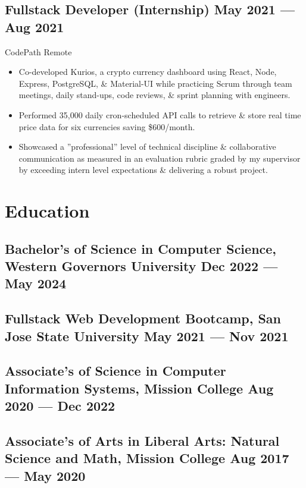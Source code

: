 \documentclass[a4,10pt]{article}
\newcommand{\subtext}[1]{
#1\par\vspace{-0.2cm}}
\newenvironment{zitemize}{
\begin{itemize}\itemsep0pt \parskip0pt \parsep1pt}
{\end{itemize}\vspace{-0.5cm}}
\begin{document}

\subsection*{Fullstack Developer {\normalsize \normalfont(Internship) } \hfill  May 2021 --- Aug 2021 }
\subtext{CodePath \hfill Remote } 
    \begin{zitemize}
        \item Co-developed Kurios, a crypto currency dashboard using React, Node, Express, PostgreSQL, \& Material-UI while practicing Scrum through team meetings, daily stand-ups, code reviews, \& sprint planning with engineers.
        \item Performed 35,000 daily cron-scheduled API calls to retrieve \& store real time price data for six currencies saving \$600/month.
        \item Showcased a ”professional” level of technical discipline \& collaborative communication as measured in an evaluation rubric graded by my supervisor by exceeding intern level expectations \& delivering a robust project.
    \end{zitemize}





\section{Education}
\subsection*{Bachelor's of Science in Computer Science, {\normalsize \normalfont Western Governors University} \hfill Dec 2022 --- May 2024} 
\vspace{0.2cm}
\subsection*{Fullstack Web Development Bootcamp, {\normalsize \normalfont San Jose State University} \hfill May 2021 --- Nov 2021} 
\vspace{0.2cm}
\subsection*{Associate's of Science in Computer Information Systems, {\normalsize \normalfont Mission College} \hfill Aug 2020 --- Dec 2022} 
\vspace{0.2cm}
\subsection*{Associate's of Arts in Liberal Arts: Natural Science and Math, {\normalsize \normalfont Mission College} \hfill Aug 2017 --- May 2020} 
{\hfill}


\end{document}
